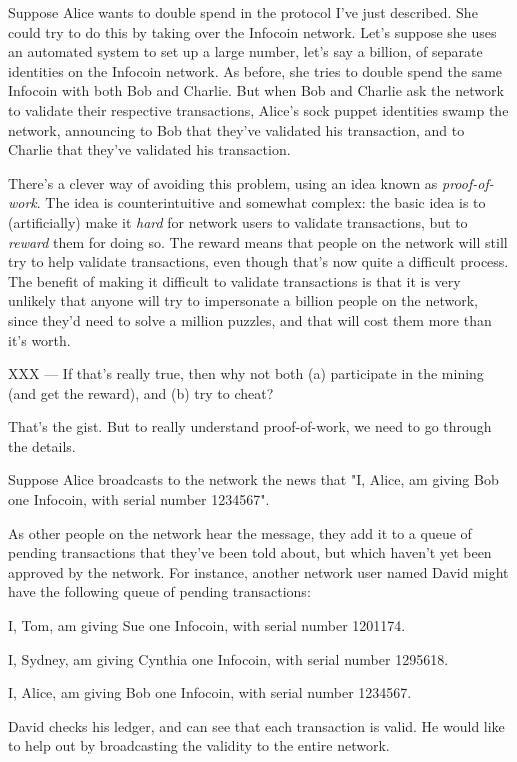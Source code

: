\documentclass[12pt]{book}
\newcounter{problem}[chapter]
\begin{document}
Suppose Alice wants to double spend in the protocol I've just
described.  She could try to do this by taking over the Infocoin
network.  Let's suppose she uses an automated system to set up a large
number, let's say a billion, of separate identities on the Infocoin
network.  As before, she tries to double spend the same Infocoin with
both Bob and Charlie.  But when Bob and Charlie ask the network to
validate their respective transactions, Alice's sock puppet identities
swamp the network, announcing to Bob that they've validated his
transaction, and to Charlie that they've validated his transaction.

There's a clever way of avoiding this problem, using an idea known as
\emph{proof-of-work}.  The idea is counterintuitive and somewhat
complex: the basic idea is to (artificially) make it \emph{hard} for
network users to validate transactions, but to \emph{reward} them for
doing so.  The reward means that people on the network will still try
to help validate transactions, even though that's now quite a
difficult process.  The benefit of making it difficult to validate
transactions is that it is very unlikely that anyone will try to
impersonate a billion people on the network, since they'd need to
solve a million puzzles, and that will cost them more than it's worth.

XXX --- If that's really true, then why not both (a) participate in
the mining (and get the reward), and (b) try to cheat?  

That's the gist.  But to really understand proof-of-work, we need to
go through the details.

Suppose Alice broadcasts to the network the news that "I, Alice, am
giving Bob one Infocoin, with serial number 1234567".  

As other people on the network hear the message, they add it to a
queue of pending transactions that they've been told about, but which
haven't yet been approved by the network.  For instance, another
network user named David might have the following queue of pending
transactions:

I, Tom, am giving Sue one Infocoin, with serial number 1201174.

I, Sydney, am giving Cynthia one Infocoin, with serial number 1295618.

I, Alice, am giving Bob one Infocoin, with serial number 1234567.

David checks his ledger, and can see that each transaction is valid.
He would like to help out by broadcasting the validity to the entire
network.  
\end{document}
